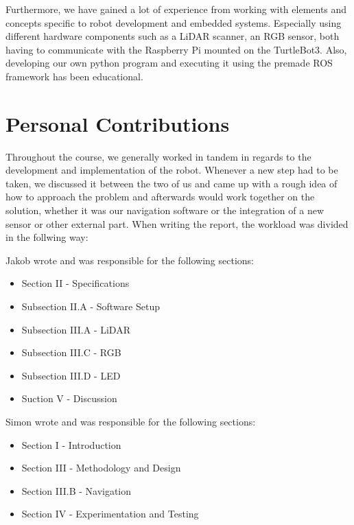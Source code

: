 \documentclass[conference]{IEEEtran}
\begin{document}
Furthermore, we have gained a lot of experience from working with elements and concepts specific to robot development and embedded systems.
Especially using different hardware components such as a LiDAR scanner, an RGB sensor, both having to communicate with the Raspberry Pi mounted on the TurtleBot3.
Also, developing our own python program and executing it using the premade ROS framework has been educational.

\section{Personal Contributions}
Throughout the course, we generally worked in tandem in regards to the development and implementation of the robot.
Whenever a new step had to be taken, we discussed it between the two of us and came up with a rough idea of how to approach the problem and afterwards would work together on the solution, whether it was our navigation software or the integration of a new sensor or other external part.
When writing the report, the workload was divided in the follwing way:

Jakob wrote and was responsible for the following sections:
\begin{itemize}
    \item Section II - Specifications
    \item Subsection II.A - Software Setup
    \item Subsection III.A - LiDAR
    \item Subsection III.C - RGB
    \item Subsection III.D - LED
    \item Suction V - Discussion
\end{itemize}

Simon wrote and was responsible for the following sections:
\begin{itemize}
    \item Section I - Introduction
    \item Section III - Methodology and Design
    \item Section III.B - Navigation
    \item Section IV - Experimentation and Testing
\end{itemize}
\end{document}
